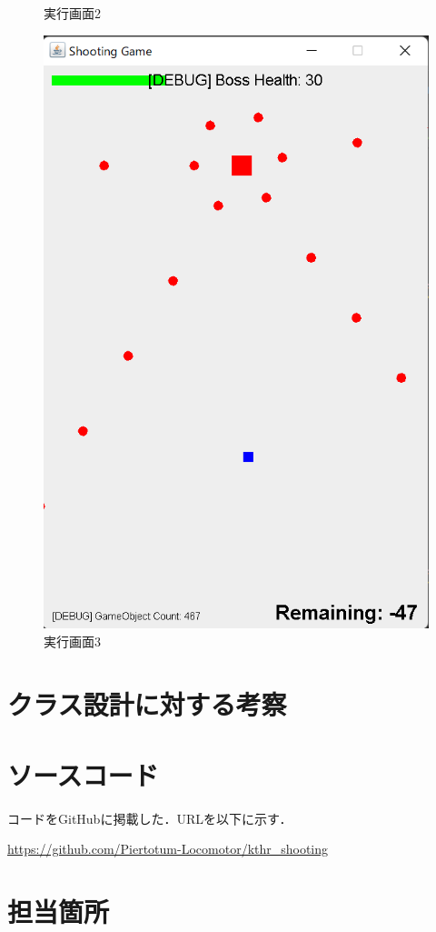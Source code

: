 \documentclass[dvipdfmx]{jlreq}
\begin{document}
\begin{figure}[H]
\begin{minipage}[b]{0.32\columnwidth}
    \caption{実行画面2}
    \label{fig:b}
\end{minipage}
\begin{minipage}[b]{0.32\columnwidth}
    \centering
    \includegraphics[width=0.7\columnwidth]{figures/result3.png}
    \caption{実行画面3}
    \label{fig:c}
\end{minipage}
\end{figure}

\section{クラス設計に対する考察}

\section{ソースコード}
コードをGitHubに掲載した．URLを以下に示す．

\url{https://github.com/Piertotum-Locomotor/kthr_shooting}
\section{担当箇所}
\end{document}
